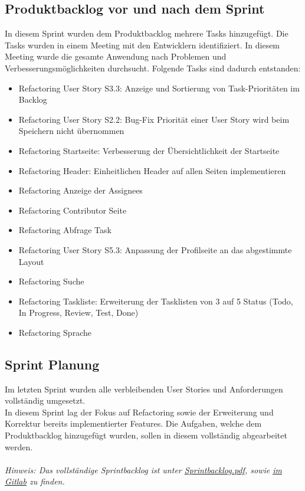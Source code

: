 \documentclass[a4paper,11pt]{article}
\begin{document}
\subsection{Produktbacklog vor und nach dem Sprint}
In diesem Sprint wurden dem Produktbacklog mehrere Tasks hinzugefügt.
Die Tasks wurden in einem Meeting mit den Entwicklern identifiziert.
In diesem Meeting wurde die gesamte Anwendung nach Problemen und Verbesserungsmöglichkeiten durchsucht.
Folgende Tasks sind dadurch entstanden:
\begin{itemize}
	\item Refactoring User Story S3.3: Anzeige und Sortierung von Task-Prioritäten im Backlog
	\item Refactoring User Story S2.2: Bug-Fix Priorität einer User Story wird beim Speichern nicht übernommen
	\item Refactoring Startseite: Verbesserung der Übersichtlichkeit der Startseite
	\item Refactoring Header: Einheitlichen Header auf allen Seiten implementieren
	\item Refactoring Anzeige der Assignees
	\item Refactoring Contributor Seite
	\item Refactoring Abfrage Task
	\item Refactoring User Story S5.3: Anpassung der Profilseite an das abgestimmte Layout
	\item Refactoring Suche
	\item Refactoring Taskliste: Erweiterung der Tasklisten von 3 auf 5 Status (Todo, In Progress, Review, Test, Done)
	\item Refactoring Sprache
\end{itemize}

\subsection{Sprint Planung}
Im letzten Sprint wurden alle verbleibenden User Stories und Anforderungen vollständig umgesetzt.\\
In diesem Sprint lag der Fokus auf Refactoring sowie der Erweiterung und Korrektur bereits implementierter Features.
Die Aufgaben, welche dem Produktbacklog hinzugefügt wurden, sollen in diesem vollständig abgearbeitet werden.\\
\\
\noindent\textit{Hinweis: Das vollständige Sprintbacklog ist unter \href{run:./Sprintbacklog.pdf}{Sprintbacklog.pdf}, sowie \href{https://git.informatik.uni-rostock.de/softwaretechnik-ws-2025-26/uebung3/team3/projekt-team3-uebung3/-/blob/main/abgabedokumente/Sprintbacklog.pdf?ref_type=heads}{im Gitlab} zu finden.}
\end{document}
